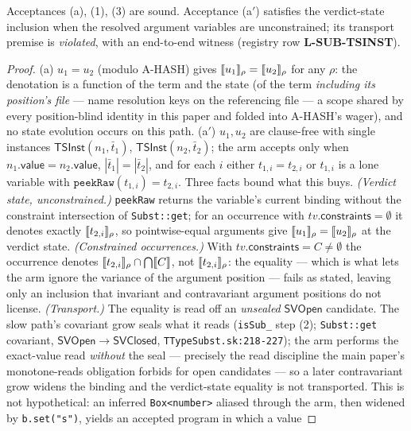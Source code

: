 \documentclass[11pt]{article}
\newcommand{\SVOpen}{\mathsf{SVOpen}}
\newcommand{\SVClosed}{\mathsf{SVClosed}}
\begin{document}
\begin{lemma}
\label{lem:fastpath}
Acceptances (a), (1), (3) are sound. Acceptance (a$'$) satisfies the
verdict-state inclusion when the resolved argument variables are
unconstrained; its transport premise is \emph{violated}, with an
end-to-end witness (registry row \textbf{L-SUB-TSINST}).
\end{lemma}
\begin{proof}
(a) $u_1 = u_2$ (modulo A-HASH) gives $\llbracket u_1 \rrbracket_\rho = \llbracket u_2 \rrbracket_\rho$
for any $\rho$: the denotation is a function of the term and the state
(of the term \emph{including its position's file} --- name resolution
keys on the referencing file --- a scope shared by every
position-blind identity in this paper and folded into A-HASH's wager),
and no state evolution occurs on this path.
(a$'$) $u_1,u_2$ are clause-free with single instances
$\mathsf{TSInst}(n_1,\bar t_1)$, $\mathsf{TSInst}(n_2,\bar t_2)$; the arm
accepts only when $n_1.\mathsf{value} = n_2.\mathsf{value}$,
$|\bar t_1| = |\bar t_2|$, and for each $i$ either $t_{1,i} = t_{2,i}$ or
$t_{1,i}$ is a lone variable with
$\texttt{peekRaw}(t_{1,i}) = t_{2,i}$. Three facts bound what this
buys.
\emph{(Verdict state, unconstrained.)} \texttt{peekRaw} returns the
variable's current binding without the constraint intersection of
\texttt{Subst::get}; for an occurrence with
$\mathit{tv}.\mathsf{constraints} = \emptyset$ it denotes exactly
$\llbracket t_{2,i} \rrbracket_\rho$, so pointwise-equal arguments give
$\llbracket u_1 \rrbracket_\rho = \llbracket u_2 \rrbracket_\rho$ at the verdict state.
\emph{(Constrained occurrences.)} With
$\mathit{tv}.\mathsf{constraints} = C \neq \emptyset$ the occurrence
denotes $\llbracket t_{2,i} \rrbracket_\rho \cap \bigcap\llbracket C \rrbracket$, not
$\llbracket t_{2,i} \rrbracket_\rho$: the equality --- which is what lets the arm ignore
the variance of the argument position --- fails as stated, leaving only
an inclusion that invariant and contravariant argument positions do not
license.
\emph{(Transport.)} The equality is read off an \emph{unsealed}
$\SVOpen$ candidate. The slow path's covariant grow seals what it reads
(\texttt{isSub\_} step (2); \texttt{Subst::get} covariant,
$\SVOpen \to \SVClosed$, \texttt{TTypeSubst.sk:218-227}); the arm
performs the exact-value read \emph{without} the seal --- precisely the
read discipline the main paper's monotone-reads obligation forbids for
open candidates --- so a later contravariant grow widens the binding and
the verdict-state equality is not transported. This is not hypothetical:
an inferred \texttt{Box<number>} aliased through the arm, then widened
by \texttt{b.set("s")}, yields an accepted program in which a value

\end{proof}
\end{document}
